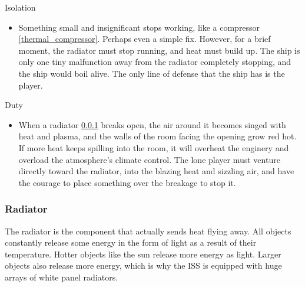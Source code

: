 \documentclass[a4paper]{article}
\begin{document}
\begin{minipage}[t]{0.4\linewidth}
Isolation
\begin{itemize}
\item Something small and insignificant stops working, like a compressor \ref{thermal_compressor}. Perhaps even a simple fix. However, for a brief moment, the radiator must stop running, and heat must build up. The ship is only one tiny malfunction away from the radiator completely stopping, and the ship would boil alive. The only line of defense that the ship has is the player.
\end{itemize}
\end{minipage}
\begin{minipage}[t]{0.4\linewidth}
Duty
\begin{itemize}
\item When a radiator \ref{thermal_radiator} breaks open, the air around it becomes singed with heat and plasma, and the walls of the room facing the opening grow red hot. If more heat keeps spilling into the room, it will overheat the enginery and overload the atmosphere's climate control. The lone player must venture directly toward the radiator, into the blazing heat and sizzling air, and have the courage to place something over the breakage to stop it.
\end{itemize}
\end{minipage}

\hspace{-18pt} \subsubsection{Radiator} \label{thermal_radiator} \vspace{-0.2cm}

The radiator is the component that actually sends heat flying away. All objects constantly release some energy in the form of light as a result of their temperature. Hotter objects like the sun release more energy as light. Larger objects also release more energy, which is why the ISS is equipped with huge arrays of white panel radiators.
\end{document}
